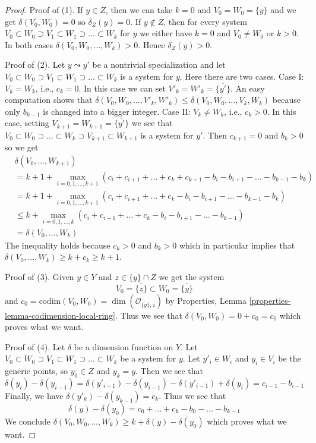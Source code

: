 \documentclass{stacks-project}
\theoremstyle{plain}
\theoremstyle{definition}
\theoremstyle{remark}
\numberwithin{equation}{subsection}
\begin{document}
\begin{proof}
Proof of (1). If $y \in Z$, then we can take $k = 0$ and
$V_0 = W_0 = \overline{\{y\}}$ and we get $\delta(V_0, W_0) = 0$ so
$\delta_Z(y) = 0$. If $y \not \in Z$, then for every system
$V_0 \subset W_0 \supset V_1 \subset W_1 \supset \ldots \subset W_k$
for $y$ we either have $k = 0$ and $V_0 \not = W_0$ or $k > 0$.
In both cases $\delta(V_0, W_0, \ldots, W_k) > 0$. Hence $\delta_Z(y) > 0$.

\medskip\noindent
Proof of (2). Let $y \leadsto y'$ be a nontrivial specialization and let
$V_0 \subset W_0 \supset V_1 \subset W_1 \supset \ldots \subset W_k$
is a system for $y$. Here there are two cases.
Case I: $V_k = W_k$, i.e., $c_k = 0$. In this case
we can set $V'_k = W'_k = \overline{\{y'\}}$.
An easy computation shows that
$\delta(V_0, W_0, \ldots, V'_k, W'_k) \leq
\delta(V_0, W_0, \ldots, V_k, W_k)$
because only $b_{k - 1}$ is changed into a bigger integer.
Case II: $V_k \not = W_k$, i.e., $c_k > 0$.
In this case, setting $V_{k + 1} = W_{k + 1} = \overline{\{y'\}}$
we see that $V_0 \subset W_0 \supset \ldots \subset W_k \supset V_{k + 1}
\subset W_{k + 1}$ is a system for $y'$. Then $c_{k + 1} = 0$ and
$b_k > 0$ so we get
\begin{align*}
& \delta(V_0, \ldots, W_{k + 1}) \\
& =
k + 1 +
\max_{i = 0, 1, \ldots, k + 1}
(c_i + c_{i + 1} + \ldots + c_k + c_{k + 1}
- b_i - b_{i + 1} - \ldots - b_{k - 1} - b_k) \\
& =
k + 1 +
\max_{i = 0, 1, \ldots, k + 1}
(c_i + c_{i + 1} + \ldots + c_k
- b_i - b_{i + 1} - \ldots - b_{k - 1} - b_k) \\
& \leq
k + \max_{i = 0, 1, \ldots, k}
(c_i + c_{i + 1} + \ldots + c_k - b_i - b_{i + 1} - \ldots - b_{k - 1}) \\
& = \delta(V_0, \ldots, W_k)
\end{align*}
The inequality holds because $c_k > 0$ and $b_k > 0$ which in particular
implies that $\delta(V_0, \ldots, W_k) \geq k + c_k \geq k + 1$.

\medskip\noindent
Proof of (3). Given $y \in Y$ and $z \in \overline{\{y\}} \cap Z$
we get the system
$$
V_0 = \overline{\{z\}} \subset W_0 = \overline{\{y\}}
$$
and $c_0 = \text{codim}(V_0, W_0) = \dim(\mathcal{O}_{\overline{\{y\}}, z})$
by Properties, Lemma \ref{properties-lemma-codimension-local-ring}.
Thus we see that $\delta(V_0, W_0) = 0 + c_0 = c_0$ which proves
what we want.

\medskip\noindent
Proof of (4). Let $\delta$ be a dimension function on $Y$.
Let $V_0 \subset W_0 \supset V_1 \subset W_1 \supset \ldots \subset W_k$
be a system for $y$. Let $y'_i \in W_i$ and $y_i \in V_i$ be the
generic points, so $y_0 \in Z$ and $y_k = y$. Then we see that
$$
\delta(y_i) - \delta(y_{i - 1}) =
\delta(y'_{i - 1}) - \delta(y_{i - 1}) - \delta(y'_{i - 1}) + \delta(y_i) =
c_{i - 1} - b_{i - 1}
$$
Finally, we have $\delta(y'_k) - \delta(y_{k - 1}) = c_k$.
Thus we see that
$$
\delta(y) - \delta(y_0) =
c_0 + \ldots + c_k - b_0 - \ldots - b_{k - 1}
$$
We conclude
$\delta(V_0, W_0, \ldots, W_k) \geq k + \delta(y) - \delta(y_0)$
which proves what we want.


\end{proof}
\end{document}
